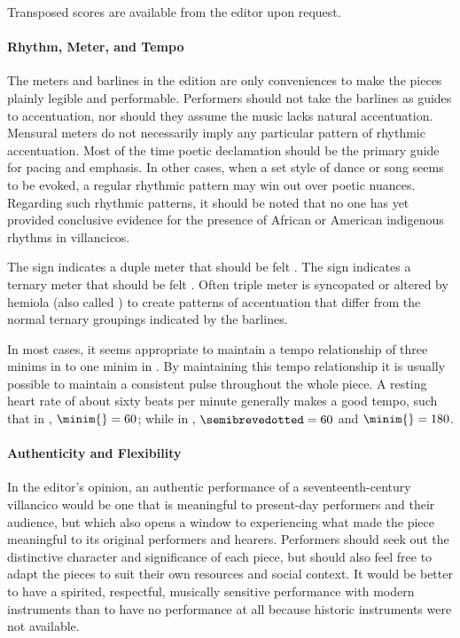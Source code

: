 Transposed scores are available from the editor upon request.

\paragraph{Rhythm, Meter, and Tempo}
The meters and barlines in the edition are only conveniences to make the pieces
plainly legible and performable.
Performers should not take the barlines as guides to accentuation, nor should 
they assume the music lacks natural accentuation.
Mensural meters do not necessarily imply any particular pattern of rhythmic 
accentuation.
Most of the time poetic declamation should be the primary guide for pacing
and emphasis.
In other cases, when a set style of dance or song seems to be evoked, a regular
rhythmic pattern may win out over poetic nuances.
Regarding such rhythmic patterns, it should be noted that no one has yet
provided conclusive evidence for the presence of African or American indigenous
rhythms in villancicos.

The sign \meterC{} indicates a duple meter that should be felt .
The sign \meterCThree{} indicates a ternary meter that should be felt
.
Often triple meter is syncopated or altered by hemiola (also called
) to create patterns of accentuation that differ from the
normal ternary groupings indicated by the barlines.

In most cases, it seems appropriate to maintain a tempo relationship of three
minims in \meterCThree{} to one minim in \meterC{}.
By maintaining this tempo relationship it is usually possible to maintain a
consistent pulse throughout the whole piece.
A resting heart rate of about sixty beats per minute generally makes a good
tempo, such that in \meterC{}, $\minim{} = 60$; while in \meterCThree,
$\semibrevedotted = 60$ and $\minim{} = 180$.


\paragraph{Authenticity and Flexibility}
In the editor's opinion, an authentic performance of a seventeenth-century
villancico would be one that is meaningful to present-day performers and their
audience, but which also opens a window to experiencing what made the piece
meaningful to its original performers and hearers.
Performers should seek out the distinctive character and significance of each
piece, but should also feel free to adapt the pieces to suit their own resources
and social context.
It would be better to have a spirited, respectful, musically sensitive
performance with modern instruments than to have no performance at all because
historic instruments were not available.

